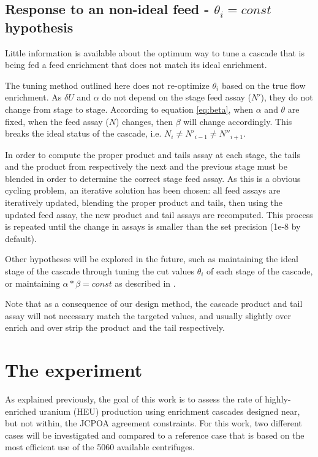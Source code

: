 \documentclass{anstrans}
\begin{document}
\subsection{Response to an non-ideal feed - $\theta_{i} = const$ hypothesis}

Little information is available about the optimum way to tune a cascade that is
being fed a feed enrichment that does not match its ideal enrichment.

The tuning method outlined here does not re-optimize $\theta_i$ based on the
true flow enrichment. As $\delta U$ and $\alpha$ do not depend on the stage feed
assay ($N'$), they do not change from stage to
stage. According to equation \eqref{eq:beta}, when $\alpha$ and $\theta$ are
fixed, when the feed assay ($N$) changes, then $\beta$ will change accordingly.
This breaks the ideal status of the cascade, i.e.  $N_{i} \neq N'_{i-1} \neq
N''_{i+1}$.

In order to compute the proper product and tails assay at each stage, the
tails and the product from respectively the next and the previous stage must be
blended in order to determine the correct stage feed assay. As this is a obvious
cycling problem, an iterative solution has been chosen: all feed assays are
iteratively updated, blending the proper product and tails, then using the
updated feed assay, the new product and tail assays are recomputed. This process
is repeated until the change in assays is smaller than the set precision (1e-8
by default).

Other hypotheses will be explored in the future, such as maintaining the ideal
stage of the cascade through tuning the cut values $\theta_{i}$ of each stage of
the cascade, or maintaining $\alpha*\beta = const$ as described in
\cite{walker.2017}.

Note that as a consequence of our design method, the cascade product and tail
assay will not necessary match the targeted values, and usually slightly over
enrich and over strip the product and the tail respectively.

\section{The experiment}

As explained previously, the goal of this work is to assess the rate of
highly-enriched uranium (HEU) production using enrichment cascades designed
near, but not within, the JCPOA agreement constraints. For this work, two
different cases will be investigated and compared to a reference case that is
based on the most efficient use of the 5060 available centrifuges.
\end{document}
